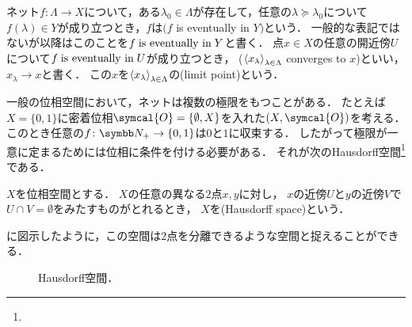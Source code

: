 \documentclass{ltjsbook}
\begin{document}
\begin{thmbox}
\begin{definition}
ネット\(f\colon \Lambda \to X\)について，ある\(\lambda_0 \in \Lambda\)が存在して，任意の\(\lambda \succeq \lambda_0\)について\(f(\lambda) \in Y\)が成り立つとき，\(f\)は\((f\) is eventually in \(Y)\)という．
一般的な表記ではないが以降はこのことを\(f \mathrel{\text{is eventually in}} Y\)と書く．
点\(x \in X\)の任意の開近傍\(U\)について\(f \mathrel{\text{is eventually in}} U\)が成り立つとき，
(\({\langle {x}_\lambda \rangle}_{\lambda \in \Lambda}\) converges to \(x\))といい，\(x_\lambda \to x\)と書く．
この\(x\)を\({\langle {x}_\lambda \rangle}_{\lambda \in \Lambda}\)の(limit point)という．
\end{definition}
\end{thmbox}

一般の位相空間において，ネットは複数の極限をもつことがある．
たとえば\(X = \{0, 1\}\)に密着位相\(\symcal{O} = \{\emptyset, X\}\)を入れた\(\tuple{X, \symcal{O}}\)を考える．
このとき任意の\(f\colon \PositiveInteger \to \{0, 1\}\)は\(0\)と\(1\)に収束する．
したがって極限が一意に定まるためには位相に条件を付ける必要がある．
それが次のHausdorff空間\footnote{}である．

\begin{thmbox}
\begin{definition}
\(X\)を位相空間とする．
\(X\)の任意の異なる\(2\)点\(x, y\)に対し，
\(x\)の近傍\(U\)と\(y\)の近傍\(V\)で\(U \cap V = \emptyset\)をみたすものがとれるとき，
\(X\)を(Hausdorff space)という．
\end{definition}
\end{thmbox}

に図示したように，この空間は\(2\)点を分離できるような空間と捉えることができる．

\begin{figure}
    \centering
    \caption{Hausdorff空間．}
\end{figure}
\end{document}
